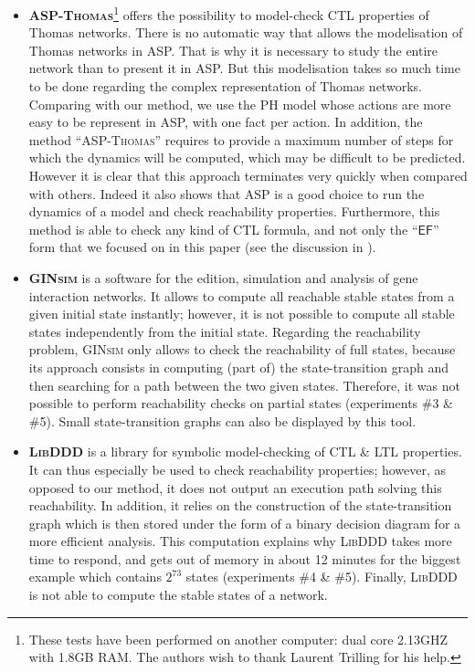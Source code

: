 \begin{itemize}

\item \textbf{\textsc{ASP-Thomas}}\footnote{These tests have been performed on another computer: dual core 2.13GHZ with 1.8GB RAM. The authors wish to thank Laurent Trilling for his help.}
offers the possibility to model-check CTL properties of Thomas networks. 
There is no automatic way that allows the modelisation of Thomas networks in ASP. That is why it is necessary to study the entire network than to present it in ASP. But this modelisation takes so much time to be done regarding the complex representation of Thomas networks. Comparing with our method, we use the PH model whose actions are more easy to be represent in ASP, with one fact per action.
In addition, the method ``\textsc{ASP-Thomas}'' requires to provide a maximum number of steps
for which the dynamics will be computed, which may be difficult to be predicted.
However it is clear that this approach terminates very quickly when compared with others.
Indeed it also shows that ASP is a good choice to run the dynamics of a model and check reachability properties.
Furthermore, this method is able to check any kind of CTL formula,
and not only the ``$\mathsf{EF}$'' form that we focused on in this paper
(see the discussion in ).

\item \textbf{\textsc{GINsim}} is a software for the edition, simulation and analysis
of gene interaction networks.
It allows to compute all reachable stable states from a given initial state instantly;
however, it is not possible to compute all stable states independently from the initial state.
Regarding the reachability problem, \textsc{GINsim} only allows to check the reachability of
full states, because its approach consists in computing
(part of) the state-transition graph and then searching for a path between the two given states.
Therefore, it was not possible to perform reachability checks on partial states
(experiments \#3 \& \#5).
Small state-transition graphs can also be displayed by this tool.

\item \textbf{\textsc{LibDDD}}
is a library for symbolic model-checking of CTL \& LTL properties.
It can thus especially be used to check reachability properties;
however, as opposed to our method, it does not output an execution path
solving this reachability.
In addition, it relies on the construction of the state-transition graph
which is then stored under the form of a binary decision diagram for a more efficient analysis.
This computation explains why \textsc{LibDDD} takes more time to respond,
and gets out of memory in about 12 minutes for the biggest example
which contains $2^{73}$ states
(experiments \#4 \& \#5).
Finally, \textsc{LibDDD} is not able to compute the stable states of a network.


\end{itemize}
